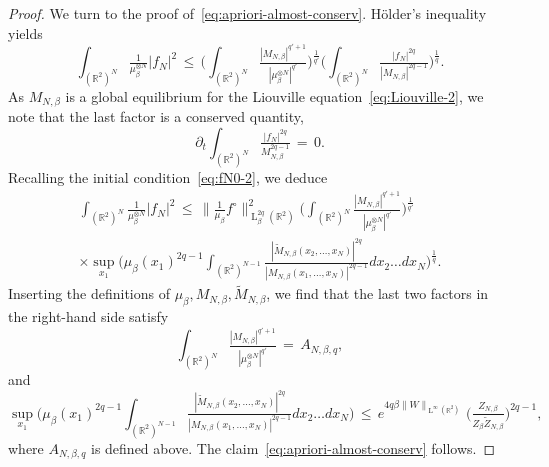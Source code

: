 \documentclass[a4paper,11pt,reqno,noindent]{amsart}
\theoremstyle{plain}
\numberwithin{equation}{section}
\newcommand{\R}{\mathbb R}
\newcommand{\3}{|\!|\!|}
\newcommand{\Ld}{\operatorname{L}}
\begin{document}
\begin{proof}
\medskip\noindent
We turn to the proof of~\eqref{eq:apriori-almost-conserv}.
H\"older's inequality yields
\[\int_{(\R^2)^N}\tfrac1{\mu_\beta^{\otimes N}}|f_N|^2\,\le\,\Big(\int_{(\R^2)^N}\tfrac{|M_{N,\beta}|^{q'+1}}{|\mu_\beta^{\otimes N}|^{q'}}\Big)^\frac1{q'}\Big(\int_{(\R^2)^N}\tfrac{|f_N|^{2q}}{|M_{N,\beta}|^{2q-1}}\Big)^\frac1q.\]
As $M_{N,\beta}$ is a global equilibrium for the Liouville equation~\eqref{eq:Liouville-2}, we note that the last factor is a conserved quantity,
\[\partial_t\int_{(\R^2)^N}\tfrac{|f_N|^{2q}}{M_{N,\beta}^{2q-1}}\,=\,0.\]
Recalling the initial condition~\eqref{eq:fN0-2}, we deduce
\begin{multline*}
\int_{(\R^2)^N}\tfrac1{\mu_\beta^{\otimes N}}|f_N|^2\,\le\,\|\tfrac1{\mu_\beta}f^\circ\|_{\Ld^{2q}_\beta(\R^2)}^2\Big(\int_{(\R^2)^N}\tfrac{|M_{N,\beta}|^{q'+1}}{|\mu_\beta^{\otimes N}|^{q'}}\Big)^\frac1{q'}\\
\times\sup_{x_1}\bigg(\mu_\beta(x_1)^{2q-1}\int_{(\R^2)^{N-1}}\tfrac{|\tilde M_{N,\beta}(x_2,\ldots,x_N)|^{2q}}{|M_{N,\beta}(x_1,\ldots,x_N)|^{2q-1}}dx_2\ldots dx_N\bigg)^\frac1q.
\end{multline*}
Inserting the definitions of $\mu_\beta,M_{N,\beta},\tilde M_{N,\beta}$, we find that the last two factors in the right-hand side satisfy
\[\int_{(\R^2)^N}\tfrac{|M_{N,\beta}|^{q'+1}}{|\mu_\beta^{\otimes N}|^{q'}}\,=\,A_{N,\beta,q},\]
and
\begin{equation*}
\sup_{x_1}\bigg(\mu_\beta(x_1)^{2q-1}\int_{(\R^2)^{N-1}}\tfrac{|\tilde M_{N,\beta}(x_2,\ldots,x_N)|^{2q}}{|M_{N,\beta}(x_1,\ldots,x_N)|^{2q-1}}dx_2\ldots dx_N\bigg)
\,\le\,e^{4q\beta \|W\|_{\Ld^\infty(\R^2)}}\,\big(\tfrac{Z_{N,\beta}}{Z_\beta \tilde Z_{N,\beta}}\big)^{2q-1},
\end{equation*}
where $A_{N,\beta,q}$ is defined above. The claim~\eqref{eq:apriori-almost-conserv} follows.



\end{proof}
\end{document}
